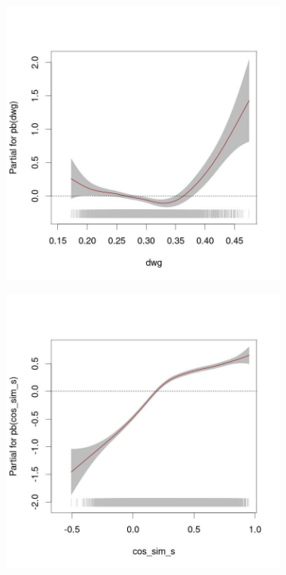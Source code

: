 \documentclass[
]{article}
\begin{document}
\begin{figure}[t!]
     \centering
     \begin{subfigure}[b]{0.49\textwidth}
         \centering
         \includegraphics[width=\textwidth]{figures/m_verb_mu_dwg.jpg}
     \end{subfigure}
     \hfill
     \begin{subfigure}[b]{0.49\textwidth}
         \centering
         \includegraphics[width=\textwidth]{figures/m_noun_mu_cos_sis.jpg}

\end{subfigure}
\end{figure}
\end{document}
